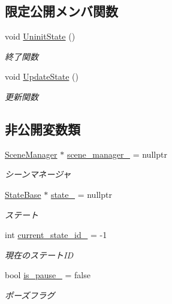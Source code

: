 \subsection*{限定公開メンバ関数}
\begin{DoxyCompactItemize}
\item 
void \mbox{\hyperlink{class_scene_base_a400172870a822dfb7e35a5a046d3ea33}{Uninit\+State}} ()
\begin{DoxyCompactList}\small\item\em 終了関数 \end{DoxyCompactList}\item 
void \mbox{\hyperlink{class_scene_base_a41ad04b353238b90571560d6b12e093c}{Update\+State}} ()
\begin{DoxyCompactList}\small\item\em 更新関数 \end{DoxyCompactList}\end{DoxyCompactItemize}
\subsection*{非公開変数類}
\begin{DoxyCompactItemize}
\item 
\mbox{\hyperlink{class_scene_manager}{Scene\+Manager}} $\ast$ \mbox{\hyperlink{class_scene_base_af9f693449ce2472d28f692bd64d5c2ef}{scene\+\_\+manager\+\_\+}} = nullptr
\begin{DoxyCompactList}\small\item\em シーンマネージャ \end{DoxyCompactList}\item 
\mbox{\hyperlink{class_scene_base_1_1_state_base}{State\+Base}} $\ast$ \mbox{\hyperlink{class_scene_base_a9d8b7237f492e9ce0724714393b0e881}{state\+\_\+}} = nullptr
\begin{DoxyCompactList}\small\item\em ステート \end{DoxyCompactList}\item 
int \mbox{\hyperlink{class_scene_base_a492dce9ca532ed498d34bc19963e0264}{current\+\_\+state\+\_\+id\+\_\+}} = -\/1
\begin{DoxyCompactList}\small\item\em 現在のステート\+ID \end{DoxyCompactList}\item 
bool \mbox{\hyperlink{class_scene_base_a57b0e6c3c278799a63a330a269f04e21}{is\+\_\+pause\+\_\+}} = false
\begin{DoxyCompactList}\small\item\em ポーズフラグ \end{DoxyCompactList}\end{DoxyCompactItemize}


